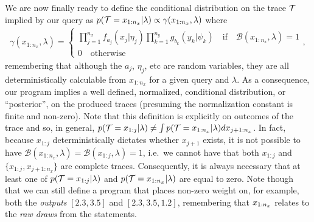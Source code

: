 We are now finally ready to define the conditional distribution on the trace $\mathcal{T}$
implied by our query as $p(\mathcal{T} = x_{1:n_x} | \lambda)
\propto \gamma(x_{1:n_x}, \lambda)$ where
\begin{align}
\label{eq:probprog:universal-cond}
\gamma(x_{1:n_x}, \lambda) = \begin{cases}
\prod_{j=1}^{n_x} 
f_{a_j}(x_j | \eta_j)
\prod_{k=1}^{n_y}
g_{b_k}(y_k | \psi_k) \quad \text{if} \quad \mathcal{B}(x_{1:n_x},\lambda)=1 \\
0 \quad \text{otherwise}
\end{cases},
\end{align}
remembering that although the $a_j$, $\eta_j$, etc are random variables, they are all deterministically
calculable from $x_{1:n_x}$ for a given query and $\lambda$.  
 As a consequence, our program implies a well
defined, normalized, conditional distribution, or ``posterior'', on the produced traces
(presuming the normalization constant is finite and non-zero). 
Note that this definition is
explicitly on outcomes of the trace and so, in general, $p(\mathcal{T} = x_{1:j} | \lambda) \neq
\int p(\mathcal{T} = x_{1:n_x} | \lambda) dx_{j+1:n_x}$.  In fact, because $x_{1:j}$ deterministically 
dictates whether $x_{j+1}$ exists, it is not possible to have $\mathcal{B}(x_{1:n_x},\lambda)=\mathcal{B}(x_{1:j},\lambda)=1$,
i.e.~we cannot have that both $x_{1:j}$ and $\{x_{1:j},x_{j+1:n_x}\}$ are complete traces.
Consequently, it is always necessary that at least one of
$p(\mathcal{T} = x_{1:j} | \lambda)$ and $p(\mathcal{T} = x_{1:n_x} | \lambda)$ are equal to zero.  Note though
that we can still define a program that places non-zero weight on, for example,
both the \emph{outputs} $[2.3,3.5]$ and $[2.3,3.5,1.2]$, remembering that $x_{1:n_x}$ relates to the 
\emph{raw draws} from the \sample statements.

